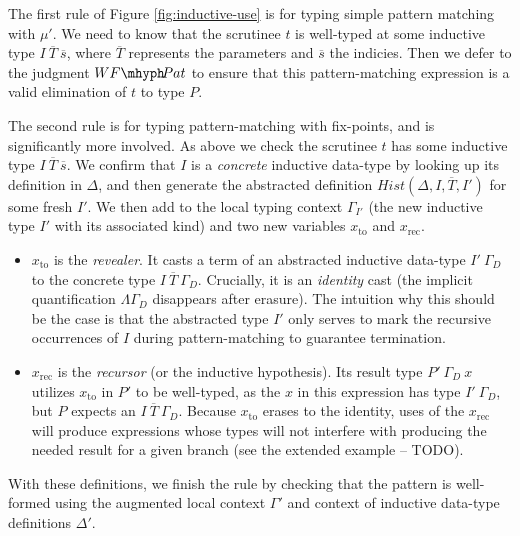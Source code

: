 \documentclass{article}
\newcommand{\vars}[1]{{\overline{#1}}}
\begin{document}
The first rule of Figure \ref{fig:inductive-use} is for typing simple pattern
matching with $\mu'$. We need to know that the scrutinee $t$ is well-typed at
some inductive type $I\ \vars{T}\ \vars{s}$, where $\vars{T}$ represents the
parameters and $\vars{s}$ the indicies. Then we defer to the judgment
$WF\mhyph\!Pat$ to ensure that this pattern-matching expression is a valid
elimination of $t$ to type $P$.

The second rule is for typing pattern-matching with fix-points, and is
significantly more involved. As above we check the scrutinee $t$ has some
inductive type $I\ \vars{T}\ \vars{s}$. We confirm that $I$ is a
\textit{concrete} inductive data-type by looking up its definition in $\Delta$,
and then generate the abstracted definition $Hist(\Delta,I,\vars{T},I')$ for some fresh
$I'$. We then add to the local typing context $\Gamma_{I'}$ (the new inductive
type $I'$ with its associated kind) and two new variables $x_{\text{to}}$ and
$x_{\text{rec}}$.

\begin{itemize}
\item $x_{\text{to}}$ is the \textit{revealer}. It casts a term of an abstracted inductive
  data-type $I'\ \Gamma_D$ to the concrete type $I\ \vars{T}\ \Gamma_D$.
  Crucially, it is an \textit{identity} cast (the implicit quantification
  $\Lambda \Gamma_D$ disappears after erasure). The intuition why this should be
  the case is that the abstracted type $I'$ only serves to mark the recursive
  occurrences of $I$ during pattern-matching to guarantee termination.
\item $x_{\text{rec}}$ is the \textit{recursor} (or the inductive hypothesis).
  Its result type $P'\ \Gamma_D\ x$ utilizes $x_{\text{to}}$ in $P'$ to be
  well-typed, as the $x$ in this expression has type $I'\ \Gamma_D$, but $P$
  expects an $I\ \vars{T}\ \Gamma_D$. Because $x_{\text{to}}$ erases to the identity, uses of the
  $x_{\text{rec}}$ will produce expressions whose types will not interfere with
  producing the needed result for a given branch (see the extended example --
  TODO).
\end{itemize}

\noindent With these definitions, we finish the rule by checking that the
pattern is well-formed using the augmented local context $\Gamma'$ and context
of inductive data-type definitions $\Delta'$.
\end{document}
